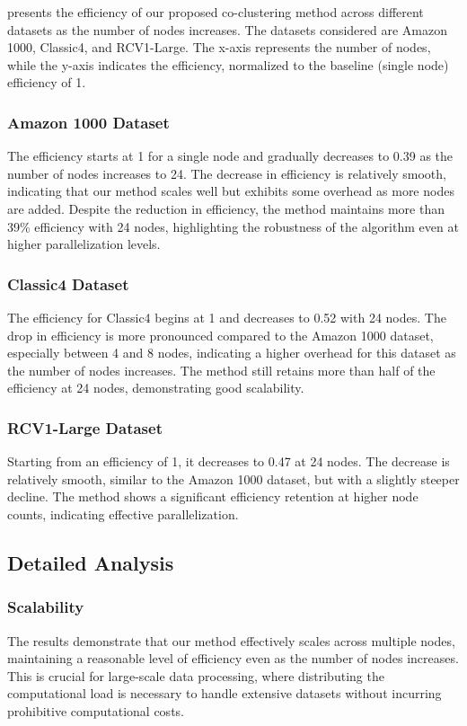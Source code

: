 \documentclass[journal]{IEEEtran}
\begin{document}
 presents the efficiency of our proposed co-clustering method across different datasets as the number of nodes increases. The datasets considered are Amazon 1000, Classic4, and RCV1-Large. The x-axis represents the number of nodes, while the y-axis indicates the efficiency, normalized to the baseline (single node) efficiency of 1.

\subsubsection{Amazon 1000 Dataset}
The efficiency starts at 1 for a single node and gradually decreases to 0.39 as the number of nodes increases to 24. The decrease in efficiency is relatively smooth, indicating that our method scales well but exhibits some overhead as more nodes are added. Despite the reduction in efficiency, the method maintains more than 39\% efficiency with 24 nodes, highlighting the robustness of the algorithm even at higher parallelization levels.

\subsubsection{Classic4 Dataset}
The efficiency for Classic4 begins at 1 and decreases to 0.52 with 24 nodes. The drop in efficiency is more pronounced compared to the Amazon 1000 dataset, especially between 4 and 8 nodes, indicating a higher overhead for this dataset as the number of nodes increases. The method still retains more than half of the efficiency at 24 nodes, demonstrating good scalability.

\subsubsection{RCV1-Large Dataset}
Starting from an efficiency of 1, it decreases to 0.47 at 24 nodes. The decrease is relatively smooth, similar to the Amazon 1000 dataset, but with a slightly steeper decline. The method shows a significant efficiency retention at higher node counts, indicating effective parallelization.

\subsection{Detailed Analysis}

\subsubsection{Scalability}
The results demonstrate that our method effectively scales across multiple nodes, maintaining a reasonable level of efficiency even as the number of nodes increases. This is crucial for large-scale data processing, where distributing the computational load is necessary to handle extensive datasets without incurring prohibitive computational costs.
\end{document}
